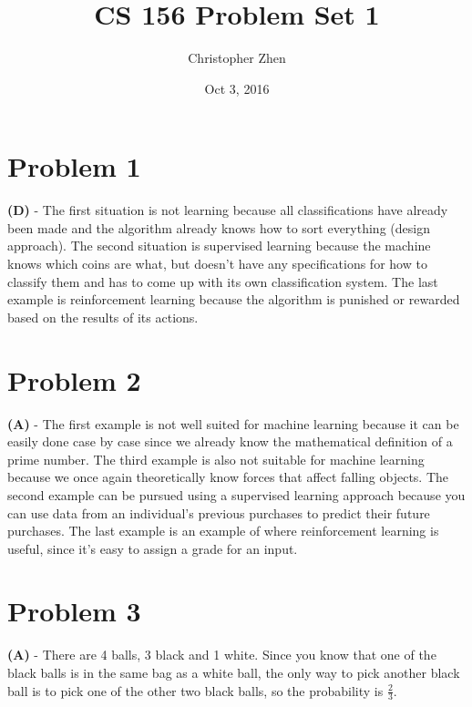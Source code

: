 \documentclass[10pt,letter]{article}
\begin{document}


\title{CS 156 Problem Set 1}

\author{Christopher Zhen}

\date{Oct 3, 2016}
 
\maketitle 


\section*{Problem 1}

\textbf{(D)} - The first situation is not learning because all classifications have already been made and the algorithm already knows how to sort everything (design approach). The second situation is supervised learning because the machine knows which coins are what, but doesn't have any specifications for how to classify them and has to come up with its own classification system. The last example is reinforcement learning because the algorithm is punished or rewarded based on the results of its actions.

\section*{Problem 2}

\textbf{(A)} - The first example is not well suited for machine learning because it can be easily done case by case since we already know the mathematical definition of a prime number. The third example is also not suitable for machine learning because we once again theoretically know forces that affect falling objects. The second example can be pursued using a supervised learning approach because you can use data from an individual's previous purchases to predict their future purchases. The last example is an example of where reinforcement learning is useful, since it's easy to assign a grade for an input.


\section*{Problem 3} 

\textbf{(A)} - There are 4 balls, 3 black and 1 white. Since you know that one of the black balls is in the same bag as a white ball, the only way to pick another black ball is to pick one of the other two black balls, so the probability is $\frac{2}{3}$.
\end{document}
